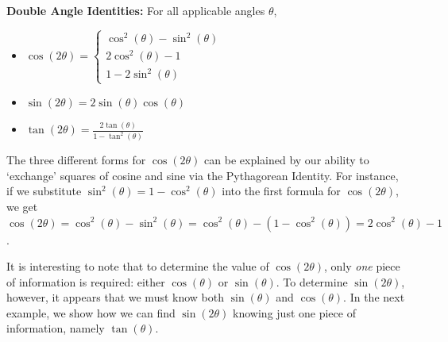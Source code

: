 \documentclass{ximera}
\begin{document}
\begin{theorem} \label{doubleangle}  \textbf{Double Angle Identities:} For all applicable angles $\theta$, 

\begin{itemize}

\item  $\cos(2\theta) = \left\{ \begin{array}{l} \cos^{2}(\theta) - \sin^{2}(\theta)\\    2\cos^{2}(\theta) - 1 \\   1-2\sin^{2}(\theta) \end{array} \right.$

\item $\sin(2\theta) = 2\sin(\theta)\cos(\theta)$

\item  $\tan(2\theta) =  \frac{2\tan(\theta)}{1 - \tan^{2}(\theta)}$

\end{itemize}

\end{theorem}

 


 

The three different forms for $\cos(2\theta)$ can be explained by our ability to `exchange' squares of cosine and sine via the Pythagorean Identity.  For instance, if we substitute $\sin^{2}(\theta) = 1 - \cos^{2}(\theta)$ into the first  formula for $\cos(2\theta)$, we get $\cos(2\theta)  = \cos^{2}(\theta) - \sin^{2}(\theta) = \cos^{2}(\theta) - (1 - \cos^{2}(\theta)) = 2 \cos^{2}(\theta) - 1$. 

 

 It is interesting to note that to determine the value of $\cos(2\theta)$, only \textit{one} piece of information is required: either $\cos(\theta)$ or $\sin(\theta)$.  To determine $\sin(2\theta)$, however, it appears that we must know both $\sin(\theta)$ and $\cos(\theta)$.  In the next example, we show how we can find $\sin(2\theta)$ knowing just one piece of information, namely $\tan(\theta)$.
\end{document}

